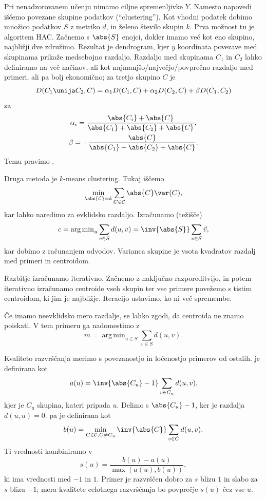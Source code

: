 
Pri nenadzorovanem učenju nimamo ciljne spremenljivke $Y$.
Namesto napovedi iščemo povezane skupine podatkov (\enquote{clustering}).
Kot vhodni podatek dobimo množico podatkov $S$ z metriko $d$, in želeno število
skupin $k$.
Prva možnost tu je algoritem HAC.
Začnemo s $\abs{S}$ enojci, dokler imamo več kot eno skupino, najbližji dve
združimo.
Rezultat je dendrogram, kjer $y$ koordinata povezave med skupinama prikaže
medsebojno razdaljo.
Razdaljo med skupinama $C_1$ in $C_2$ lahko definiramo na več načinov, ali kot
najmanjšo/največjo/povprečno razdaljo med primeri, ali pa bolj ekonomično; za
tretjo skupino $C$ je
\[
  D(C_1 \unija C_2, C) = \alpha_1 D(C_1, C) + \alpha_2 D(C_2, C) + \beta D(C_1,
  C_2)
\]
za
\begin{gather*}
  \alpha_i = \frac{\abs{C_i} + \abs{C}}{\abs{C_1} + \abs{C_2} + \abs{C}}, \\
  \beta = - \frac{\abs{C}}{\abs{C_1} + \abs{C_2} + \abs{C}}.
\end{gather*}
Temu pravimo .


Druga metoda je $k$-means clustering.
Tukaj iščemo
\[
  \min_{\abs{\mathcal{C}} = k} \sum_{C \in \mathcal{C}} \abs{C} \var(C),
\]
kar lahko naredimo za evklidsko razdaljo.
Izračunamo  (težišče)
\[
  c = \operatorname{arg\,min}_u \sum_{v \in S} d(u,v)
  = \inv{\abs{S}} \sum_{v \in S} \vec{v},
\]
kar dobimo z računanjem odvodov.
Varianca skupine je vsota kvadratov razdalj med primeri in centroidom.

Razbitje izračunamo iterativno.
Začnemo z naključno razporeditvijo, in potem iterativno izračunamo centroide
vseh skupin ter vse primere povežemo s tistim centroidom, ki jim je najbližje.
Iteracijo ustavimo, ko ni več spremembe.

Če imamo neevklidsko mero razdalje, se lahko zgodi, da centroida ne znamo
poiskati.
V tem primeru ga nadomestimo z 
\[
  m = \operatorname{arg\,min}_{u \in S} \sum_{v \in S} d(u,v).
\]


Kvaliteto razvrščanja merimo s povezanostjo in ločenostjo primerov od ostalih.
 je definirana kot
\[
  a(u) = \inv{\abs{C_u} - 1} \sum_{v \in C_u} d(u,v),
\]
kjer je $C_u$ skupina, kateri pripada $u$.
Delimo s $\abs{C_u} - 1$, ker je razdalja $d(u,u) = 0$.
 pa je definirana kot
\[
  b(u) = \min_{C \in \mathcal{C}, C \ne C_u} \inv{\abs{C}} \sum_{v \in C} d(u,v).
\]
Ti vrednosti kombiniramo v 
\[
  s(u) = \frac{b(u) - a(u)}{\max(a(u), b(u))},
\]
ki ima vrednosti med $-1$ in $1$.
Primer je razvrščen dobro za $s$ blizu $1$ in slabo za $s$ blizu $-1$; mera
kvalitete celotnega razvrščanja bo povprečje $s(u)$ čez vse $u$.


